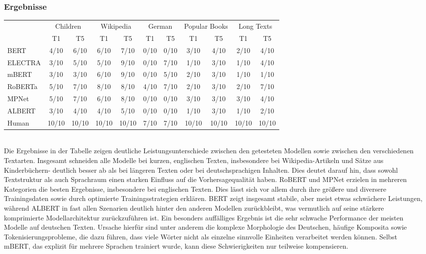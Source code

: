 \documentclass[a4paper, 11pt]{article}          %
\begin{document}
\subsubsection{Ergebnisse}
\begin{tabular}{l cc cc cc cc cc}
& \multicolumn{2}{c}{Children}
& \multicolumn{2}{c}{Wikipedia}
& \multicolumn{2}{c}{German}
& \multicolumn{2}{c}{Popular Books}
& \multicolumn{2}{c}{Long Texts} \\
\cmidrule(lr){2-3}
\cmidrule(lr){4-5}
\cmidrule(lr){6-7}
\cmidrule(lr){8-9}
\cmidrule(lr){10-11}
& T1 & T5 & T1 & T5 & T1 & T5 & T1 & T5 & T1 & T5 \\
\midrule
BERT & 4/10 & 6/10 & 6/10 & 7/10 & 0/10 & 0/10 & 3/10 & 4/10 & 2/10 & 4/10  \\
ELECTRA            & 3/10 & 5/10 & 5/10 & 9/10 & 0/10 & 7/10 & 1/10 & 3/10 & 1/10 & 4/10  \\
mBERT           & 3/10 & 3/10 & 6/10 & 9/10 & 0/10 & 5/10 & 2/10 & 3/10 & 1/10 & 1/10  \\
RoBERTa     & 5/10 & 7/10 & 8/10 & 8/10 & 4/10 & 7/10 & 2/10 & 3/10 & 2/10 & 7/10  \\
MPNet     & 5/10 & 7/10 & 6/10 & 8/10 & 0/10 & 0/10 & 3/10 & 3/10 & 3/10 & 4/10  \\
ALBERT     & 3/10 & 4/10 & 4/10 & 5/10 & 0/10 & 0/10 & 1/10 & 3/10 & 1/10 & 2/10 \\
Human     & 10/10 & 10/10 & 10/10 & 10/10 & 7/10 & 7/10 & 10/10 & 10/10 & 10/10 & 10/10  \\
\end{tabular}
\vspace{1em}
\noindent\\
Die Ergebnisse in der Tabelle zeigen deutliche Leistungsunterschiede zwischen den getesteten Modellen sowie zwischen den verschiedenen Textarten.
Insgesamt schneiden alle Modelle bei kurzen, englischen Texten, insbesondere bei Wikipedia-Artikeln und Sätze aus Kinderbüchern- deutlich besser ab als bei längeren Texten oder bei deutschsprachigen Inhalten. 
Dies deutet darauf hin, dass sowohl Textstruktur als auch Sprachraum einen starken Einfluss auf die Vorhersagequalität haben. 
RoBERT und MPNet erzielen in mehreren Kategorien die besten Ergebnisse, insbesondere bei englischen Texten.
Dies lässt sich vor allem durch ihre größere und diversere Trainingsdaten sowie durch optimierte Trainingsstrategien erklären. 
BERT zeigt insgesamt stabile, aber meist etwas schwächere Leistungen, während ALBERT in fast allen Szenarien deutlich hinter den anderen Modellen zurückbleibt, was vermutlich auf seine stärkere komprimierte Modellarchitektur zurückzuführen ist. 
Ein besonders auffälliges Ergebnis ist die sehr schwache Performance der meisten Modelle auf deutschen Texten. 
Ursache hierfür sind unter anderem die komplexe Morphologie des Deutschen, häufige Komposita sowie Tokenisierungsprobleme, die dazu führen, dass viele Wörter nicht als einzelne sinnvolle Einheiten verarbeitet werden können.
Selbst mBERT, das explizit für mehrere Sprachen trainiert wurde, kann diese Schwierigkeiten nur teilweise kompensieren. 
\end{document}
